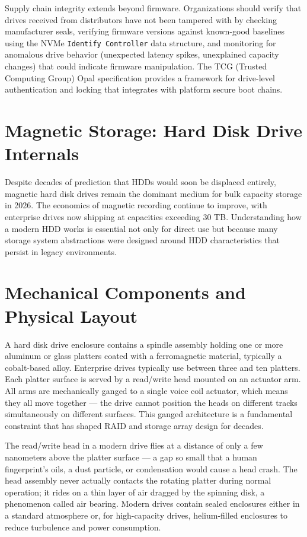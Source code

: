 \begin{securitybox}
Supply chain integrity extends beyond firmware. Organizations should verify that drives received from distributors have not been tampered with by checking manufacturer seals, verifying firmware versions against known-good baselines using the NVMe \texttt{Identify Controller} data structure, and monitoring for anomalous drive behavior (unexpected latency spikes, unexplained capacity changes) that could indicate firmware manipulation. The TCG (Trusted Computing Group) Opal specification provides a framework for drive-level authentication and locking that integrates with platform secure boot chains.

\end{securitybox}


\section{Magnetic Storage: Hard Disk Drive Internals}
Despite decades of prediction that HDDs would soon be displaced entirely, magnetic hard disk drives remain the dominant medium for bulk capacity storage in 2026. The economics of magnetic recording continue to improve, with enterprise drives now shipping at capacities exceeding 30 TB. Understanding how a modern HDD works is essential not only for direct use but because many storage system abstractions were designed around HDD characteristics that persist in legacy environments.

\section{Mechanical Components and Physical Layout}
A hard disk drive enclosure contains a spindle assembly holding one or more aluminum or glass platters coated with a ferromagnetic material, typically a cobalt-based alloy. Enterprise drives typically use between three and ten platters. Each platter surface is served by a read/write head mounted on an actuator arm. All arms are mechanically ganged to a single voice coil actuator, which means they all move together --- the drive cannot position the heads on different tracks simultaneously on different surfaces. This ganged architecture is a fundamental constraint that has shaped RAID and storage array design for decades.

The read/write head in a modern drive flies at a distance of only a few nanometers above the platter surface --- a gap so small that a human fingerprint's oils, a dust particle, or condensation would cause a head crash. The head assembly never actually contacts the rotating platter during normal operation; it rides on a thin layer of air dragged by the spinning disk, a phenomenon called air bearing. Modern drives contain sealed enclosures either in a standard atmosphere or, for high-capacity drives, helium-filled enclosures to reduce turbulence and power consumption.

